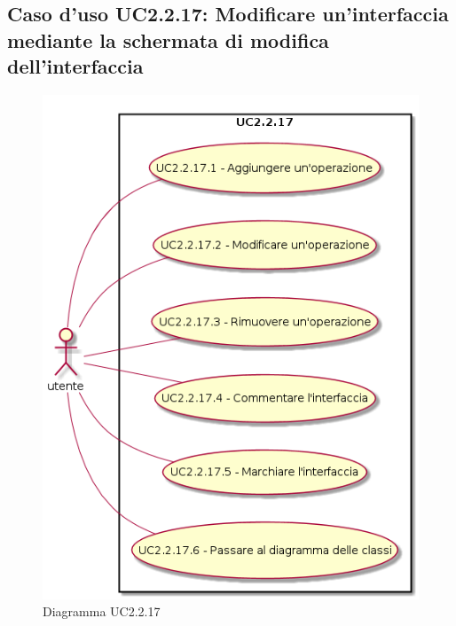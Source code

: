 \documentclass[../AnalisiDeiRequisiti.tex]{subfiles}
\begin{document}
			\subsection{Caso d'uso UC2.2.17: Modificare un'interfaccia mediante la schermata di modifica dell'interfaccia}
			\begin{figure} [H]
				\centering
				\includegraphics[scale=0.45]{./Figures/UC2-2-17.png}
				\caption{Diagramma UC2.2.17}\label{}
			\end{figure}
\end{document}
